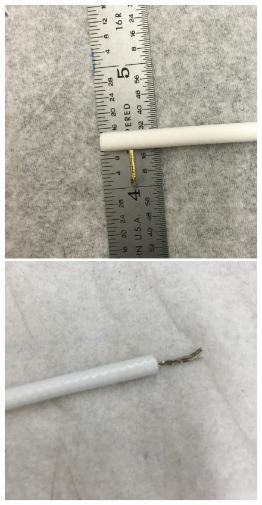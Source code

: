 \begin{figure}[htbp]
\begin{minipage}{0.47\textwidth}
    \includegraphics[width=\linewidth]{figures/testbed/ft3_1.jpg}
    \end{minipage}
    \hspace{\fill} %
    \begin{minipage}{0.47\textwidth}
    \includegraphics[width=\linewidth]{figures/testbed/ft3_2.jpg}
    \end{minipage}


\end{figure}
